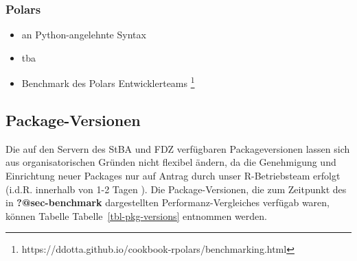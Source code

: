 \documentclass[
  german,
  10pt,
  twoside]{article}
\providecommand{\tightlist}{%
  \setlength{\itemsep}{0pt}\setlength{\parskip}{0pt}}
\let\oldref\ref
\renewcommand{\ref}[1]{\oldref{#1}\raisebox{-0.2ex}{\scriptsize\color{wistaBlue}\ding{247}}}
\begin{document}
\subsubsection{Polars}\label{polars}

\begin{itemize}
\tightlist
\item
  an Python-angelehnte Syntax \autocite{R-polars}
\item
  tba
\item
  Benchmark des Polars Entwicklerteams \footnote{https://ddotta.github.io/cookbook-rpolars/benchmarking.html}
\end{itemize}

\subsection{Package-Versionen}\label{package-versionen}

Die auf den Servern des StBA und FDZ verfügbaren Packageversionen lassen
sich aus organisatorischen Gründen nicht flexibel ändern, da die
Genehmigung und Einrichtung neuer Packages nur auf Antrag durch unser
R-Betriebsteam erfolgt (i.d.R. innerhalb von 1-2 Tagen ). Die
Package-Versionen, die zum Zeitpunkt des in \textbf{?@sec-benchmark}
dargestellten Performanz-Vergleiches verfügab waren, können Tabelle
Tabelle~\ref{tbl-pkg-versions} entnommen werden.

\begin{table}

\caption{\label{tbl-pkg-versions}Versionen verfügbarer R-Packages}


\end{table}%


\printbibliography
\end{document}
